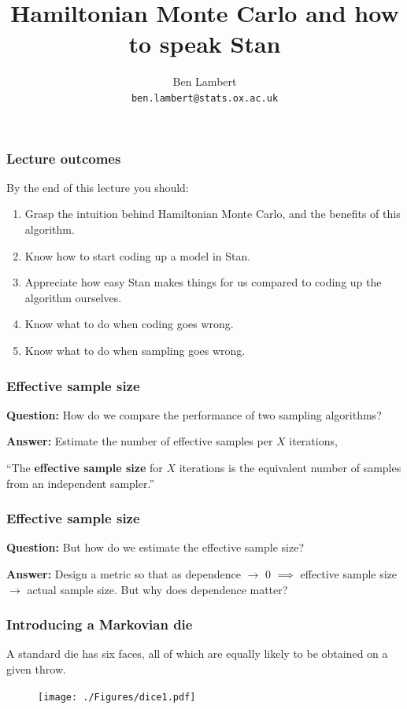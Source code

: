\documentclass[handout]{beamer}
\title{Hamiltonian Monte Carlo and how to speak Stan}
\author[Ben Lambert]{Ben Lambert\inst{1}\\ \texttt{ben.lambert@stats.ox.ac.uk}}
\begin{document}
\begin{frame}
\titlepage
\end{frame}

\begin{frame}
\frametitle{Lecture outcomes}

By the end of this lecture you should:
\begin{enumerate}
	\item<3-> Grasp the intuition behind Hamiltonian Monte Carlo, and the benefits of this algorithm.
	\item<4-> Know how to start coding up a model in Stan.
	\item<5-> Appreciate how easy Stan makes things for us compared to coding up the algorithm ourselves.
	\item<6-> Know what to do when coding goes wrong.
	\item<7-> Know what to do when sampling goes wrong.
\end{enumerate}

\end{frame}


\begin{frame}
	\frametitle{Effective sample size}
	\textbf{Question:} How do we compare the performance of two sampling algorithms?
	
	\vspace{0.2cm}
	
	 \textbf{Answer:} Estimate the number of effective samples per $X$ iterations,
	
	 ``The \textbf{effective sample size} for $X$ iterations is the equivalent number of samples from an independent sampler.''  
	
\end{frame}

\begin{frame}
	\frametitle{Effective sample size}
	\textbf{Question:} But how do we estimate the effective sample size?
	
	\vspace{0.2cm}
	
	\textbf{Answer:} Design a metric so that as dependence $\rightarrow$ 0 $\implies$ effective sample size $\rightarrow$ actual sample size. \onslide<4-> But why does dependence matter?
\end{frame}

\begin{frame}
	\frametitle{Introducing a Markovian die}
	 A standard die has six faces, all of which are equally likely to be obtained on a given throw.
	
	\begin{figure}[ht]
		\centerline{\texttt{[image: ./Figures/dice1.pdf]}}
	\end{figure}
	
\end{frame}
\end{document}
